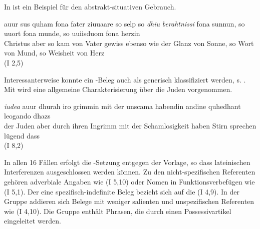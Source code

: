 In  ist ein Beispiel für den abstrakt-situativen  Gebrauch. 
%
\begin{exe}
\ex \label{ex:I683}  {auur} {sus} {quham} {fona} {fater} {ziuuaare} {so selp so} {\textit{dhiu}} {\textit{berahtnissi}} {fona} {sunnun}, {so} {uuort} {fona} {munde}, {so} {uuiisduom} {fona} {herzin} \\
{Christus} {aber} {so} {kam} {von} {Vater} {gewiss} {ebenso wie} {der} {Glanz} {von} {Sonne}, {so} {Wort} {von} {Mund}, {so} {Weisheit} {von} {Herz} {}\\
\glt {} (I 2,5)
\end{exe}

Interessanterweise konnte ein -Beleg auch als generisch  klassifiziert werden, s. . Mit  wird eine allgemeine Charakterisierung über die Juden vorgenommen. 
%

\begin{exe}
\ex \label{ex:I4768}  {\textit{iudea}} {auur} {dhurah} {iro} {grimmin} {mit} {der} {unscama} {habendin} {andine} {quhedhant} {leogando} {dhazs}\\
{der} {Juden} {aber} {durch} {ihren} {Ingrimm} {mit} {der} {Schamlosigkeit} {haben} {Stirn} {sprechen} {lügend} {dass}\\
\glt {}(I 8,2)
\end{exe}

In allen 16 Fällen erfolgt die -Setzung entgegen der Vorlage, so dass lateinischen Interferenzen ausgeschlossen werden können. Zu den nicht-spezifischen Referenten  gehören adverbiale  Angaben wie   (I 5,10) oder Nomen in Funktionsverbefügen wie   (I 5,1). Der eine spezifisch-indefinite  Beleg bezieht sich auf die    (I 4,9). In der Gruppe  addieren sich Belege mit weniger salienten und unspezifischen  Referenten wie   (I 4,10). Die Gruppe  enthält  Phrasen, die durch einen  Possessivartikel eingeleitet werden. 

